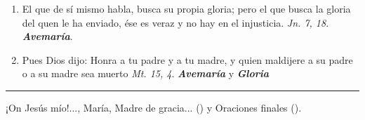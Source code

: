 \documentclass[./rosary.tex]{subfiles}
\begin{document}
\begin{enumerate}
      \item El que de sí mismo habla, busca su propia gloria; pero el que busca la gloria del quen le ha enviado, ése es veraz y no hay en el injusticia.
            \emph{Jn. 7, 18}. \textbf{\emph{Avemaría}}.

      \item Pues Dios dijo: Honra a tu padre y a tu madre, y quien maldijere a su padre o a su madre sea muerto \emph{Mt. 15, 4}. \textbf{\emph{Avemaría}} y \textbf{\emph{Gloria}}
\end{enumerate}

\rule{\textwidth}{0.5pt}

¡On Jesús mío!..., María, Madre de gracia... () y Oraciones finales ().
\end{document}
